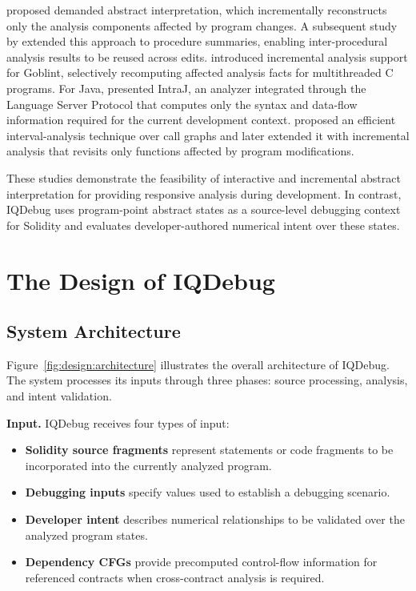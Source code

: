 \documentclass[11pt,oneside]{report}
\theoremstyle{plain}
\theoremstyle{definition}
\theoremstyle{remark}
\begin{document}
\citet{daig} proposed demanded abstract interpretation, which incrementally reconstructs only the analysis components affected by program changes.
A subsequent study by \citet{ds} extended this approach to procedure summaries, enabling inter-procedural analysis results to be reused across edits.
\citet{iac} introduced incremental analysis support for Goblint, selectively recomputing affected analysis facts for multithreaded C programs.
For Java, \citet{iaj} presented IntraJ, an analyzer integrated through the Language Server Protocol that computes only the syntax and data-flow information required for the current development context.
\citet{fap} proposed an efficient interval-analysis technique over call graphs and later extended it with incremental analysis that revisits only functions affected by program modifications.

These studies demonstrate the feasibility of interactive and incremental abstract interpretation for providing responsive analysis during development.
In contrast, IQDebug uses program-point abstract states as a source-level debugging context for Solidity and evaluates developer-authored numerical intent over these states.

\chapter{The Design of IQDebug}\label{chap:design}
\section{System Architecture}\label{sec:design:overview}

Figure~\ref{fig:design:architecture} illustrates the overall architecture of IQDebug.
The system processes its inputs through three phases: source processing, analysis, and intent validation.

\smallskip
\noindent\textbf{Input.}
IQDebug receives four types of input:

\begin{itemize}
    \item \textbf{Solidity source fragments} represent statements or code fragments to be incorporated into the currently analyzed program.
    \item \textbf{Debugging inputs} specify values used to establish a debugging scenario.
    \item \textbf{Developer intent} describes numerical relationships to be validated over the analyzed program states.
    \item \textbf{Dependency CFGs} provide precomputed control-flow information for referenced contracts when cross-contract analysis is required.
\end{itemize}
\end{document}
